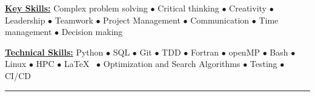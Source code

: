 \vspace*{-5mm}
\begin{multicols}{2}
    \begin{spacing}{1}
        \href{.}{\bf Key Skills:}
        Complex problem solving $\bullet$ Critical thinking $\bullet$ Creativity $\bullet$ Leadership $\bullet$ Teamwork $\bullet$ Project Management $\bullet$ Communication $\bullet$ Time management $\bullet$ Decision making

        \href{.}{\bf Technical Skills:}
        Python $\bullet$ SQL $\bullet$ Git $\bullet$ TDD $\bullet$ Fortran $\bullet$ openMP $\bullet$ Bash $\bullet$ Linux $\bullet$ HPC $\bullet$ \LaTeX~ $\bullet$ Optimization and Search Algorithms $\bullet$ Testing $\bullet$ CI/CD
    \end{spacing}
\end{multicols}

\vspace*{-10mm}
\begin{center}
    \par\rule{1.0\textwidth}{0.6pt}
\end{center}
\vspace*{-2mm}